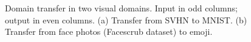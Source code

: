 \documentclass{article} %
\begin{document}
\begin{figure}[t]
\centering
{}
\caption{\label{fig:svnhmnistsamples}Domain transfer in two visual domains. Input in odd columns; output in even columns. (a) Transfer from SVHN to MNIST. (b) Transfer from face photos (Facescrub dataset) to emoji.}
\end{figure}
\end{document}
